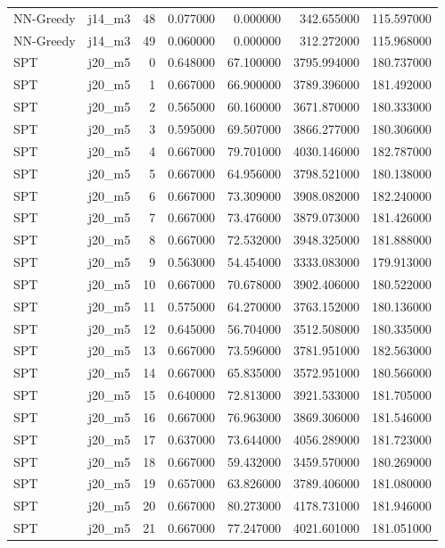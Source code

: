 \begin{tabular}{llrrrrr}
NN-Greedy & j14_m3 & 48 & 0.077000 & 0.000000 & 342.655000 & 115.597000 \\
NN-Greedy & j14_m3 & 49 & 0.060000 & 0.000000 & 312.272000 & 115.968000 \\
SPT & j20_m5 & 0 & 0.648000 & 67.100000 & 3795.994000 & 180.737000 \\
SPT & j20_m5 & 1 & 0.667000 & 66.900000 & 3789.396000 & 181.492000 \\
SPT & j20_m5 & 2 & 0.565000 & 60.160000 & 3671.870000 & 180.333000 \\
SPT & j20_m5 & 3 & 0.595000 & 69.507000 & 3866.277000 & 180.306000 \\
SPT & j20_m5 & 4 & 0.667000 & 79.701000 & 4030.146000 & 182.787000 \\
SPT & j20_m5 & 5 & 0.667000 & 64.956000 & 3798.521000 & 180.138000 \\
SPT & j20_m5 & 6 & 0.667000 & 73.309000 & 3908.082000 & 182.240000 \\
SPT & j20_m5 & 7 & 0.667000 & 73.476000 & 3879.073000 & 181.426000 \\
SPT & j20_m5 & 8 & 0.667000 & 72.532000 & 3948.325000 & 181.888000 \\
SPT & j20_m5 & 9 & 0.563000 & 54.454000 & 3333.083000 & 179.913000 \\
SPT & j20_m5 & 10 & 0.667000 & 70.678000 & 3902.406000 & 180.522000 \\
SPT & j20_m5 & 11 & 0.575000 & 64.270000 & 3763.152000 & 180.136000 \\
SPT & j20_m5 & 12 & 0.645000 & 56.704000 & 3512.508000 & 180.335000 \\
SPT & j20_m5 & 13 & 0.667000 & 73.596000 & 3781.951000 & 182.563000 \\
SPT & j20_m5 & 14 & 0.667000 & 65.835000 & 3572.951000 & 180.566000 \\
SPT & j20_m5 & 15 & 0.640000 & 72.813000 & 3921.533000 & 181.705000 \\
SPT & j20_m5 & 16 & 0.667000 & 76.963000 & 3869.306000 & 181.546000 \\
SPT & j20_m5 & 17 & 0.637000 & 73.644000 & 4056.289000 & 181.723000 \\
SPT & j20_m5 & 18 & 0.667000 & 59.432000 & 3459.570000 & 180.269000 \\
SPT & j20_m5 & 19 & 0.657000 & 63.826000 & 3789.406000 & 181.080000 \\
SPT & j20_m5 & 20 & 0.667000 & 80.273000 & 4178.731000 & 181.946000 \\
SPT & j20_m5 & 21 & 0.667000 & 77.247000 & 4021.601000 & 181.051000 \\

\end{tabular}
